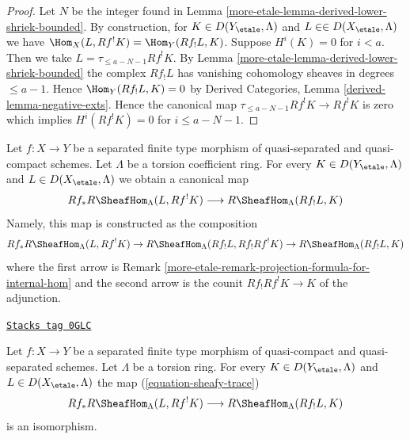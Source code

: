 \begin{proof}
Let $N$ be the integer found in Lemma \ref{more-etale-lemma-derived-lower-shriek-bounded}.
By construction, for $K \in D(Y_\etale, \Lambda)$ and
$L \in \in D(X_\etale, \Lambda)$ we have
$\Hom_X(L, Rf^!K) = \Hom_Y(Rf_!L, K)$. Suppose $H^i(K) = 0$
for $i < a$. Then we take $L = \tau_{\leq a - N - 1}Rf^!K$. By
Lemma \ref{more-etale-lemma-derived-lower-shriek-bounded}
the complex $Rf_!L$ has vanishing cohomology sheaves in
degrees $\leq a - 1$. Hence $\Hom_Y(Rf_!L, K) = 0$ by
Derived Categories, Lemma \ref{derived-lemma-negative-exts}.
Hence the canonical map $\tau_{\leq a - N - 1}Rf^!K \to Rf^!K$
is zero which implies $H^i(Rf^!K) = 0$ for $i \leq a - N - 1$.
\end{proof}

Let $f : X \to Y$ be a separated finite type morphism of quasi-separated
and quasi-compact schemes. Let $\Lambda$ be a torsion coefficient ring.
For every $K \in D(Y_\etale, \Lambda)$ and $L \in D(X_\etale, \Lambda)$
we obtain a canonical map
\begin{equation}
\label{equation-sheafy-trace}
Rf_*R\SheafHom_\Lambda(L, Rf^!K) \longrightarrow R\SheafHom_\Lambda(Rf_!L, K)
\end{equation}
Namely, this map is constructed as the composition
$$
Rf_*R\SheafHom_\Lambda(L, Rf^!K) \to
R\SheafHom_\Lambda(Rf_!L, Rf_!Rf^!K) \to
R\SheafHom_\Lambda(Rf_!L, K)
$$
where the first arrow is
Remark \ref{more-etale-remark-projection-formula-for-internal-hom}
and the second arrow is the counit $Rf_!Rf^!K \to K$ of the adjunction.

\begin{lemma}
\label{more-etale-lemma-iso-on-RSheafHom}
\href{https://stacks.math.columbia.edu/tag/0GLC}{\texttt{Stacks tag 0GLC}}

Let $f : X \to Y$ be a separated finite type morphism of quasi-compact and
quasi-separated schemes. Let $\Lambda$ be a torsion ring.
For every $K \in D(Y_\etale, \Lambda)$ and $L \in D(X_\etale, \Lambda)$
the map (\ref{equation-sheafy-trace})
$$
Rf_*R\SheafHom_\Lambda(L, Rf^!K) \longrightarrow R\SheafHom_\Lambda(Rf_!L, K)
$$
is an isomorphism.
\end{lemma}

